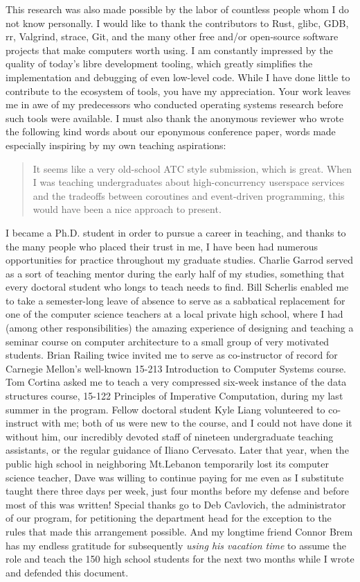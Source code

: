 This research was also made possible by the labor of countless people whom I do not
know personally.  I would like to thank the contributors to Rust, glibc, GDB, rr,
Valgrind, strace, Git, and the many other free and/or open-source software projects
that make computers worth using.  I am constantly impressed by the quality of today's
libre development tooling, which greatly simplifies the implementation and debugging
of even low-level code.  While I have done little to contribute to the ecosystem of
tools, you have my appreciation.  Your work leaves me in awe of my predecessors who
conducted operating systems research before such tools were available.  I must also
thank the anonymous reviewer who wrote the following kind words about our eponymous
conference paper, words made especially inspiring by my own teaching aspirations:
\begin{quote}
It seems like a very old-school ATC style submission, which is great.  When I was
teaching undergraduates about high-concurrency userspace services and the tradeoffs
between coroutines and event-driven programming, this would have been a nice approach
to present.
\end{quote}

I became a Ph.D. student in order to pursue a career in teaching, and thanks to the
many people who placed their trust in me, I have been had numerous opportunities for
practice throughout my graduate studies.  Charlie Garrod served as a sort of teaching
mentor during the early half of my studies, something that every doctoral student who
longs to teach needs to find.  Bill Scherlis enabled me to take a semester-long leave
of absence to serve as a sabbatical replacement for one of the computer science
teachers at a local private high school, where I had (among other responsibilities)
the amazing experience of designing and teaching a seminar course on computer
architecture to a small group of very motivated students.  Brian Railing twice
invited me to serve as co-instructor of record for Carnegie Mellon's well-known
15-213 Introduction to Computer Systems course.  Tom Cortina asked me to teach a very
compressed six-week instance of the data structures course, 15-122 Principles of
Imperative Computation, during my last summer in the program.  Fellow doctoral
student Kyle Liang volunteered to co-instruct with me; both of us were new to the
course, and I could not have done it without him, our incredibly devoted staff of
nineteen undergraduate teaching assistants, or the regular guidance of Iliano
Cervesato.  Later that year, when the public high school in neighboring Mt.\@ Lebanon
temporarily lost its computer science teacher, Dave was willing to continue paying
for me even as I substitute taught there three days per week, just four months before
my defense and before most of this \thesis was written!  Special thanks go to Deb
Cavlovich, the administrator of our program, for petitioning the department head for
the exception to the rules that made this arrangement possible.  And my longtime
friend Connor Brem has my endless gratitude for subsequently \textit{using his
vacation time} to assume the role and teach the 150 high school students for the next
two months while I wrote and defended this document.

